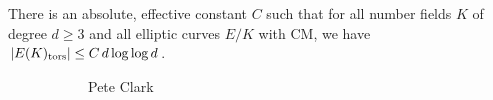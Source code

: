 \begin{frame}[plain]
\begin{thm}
There is an absolute, effective constant $C$ such that for all number fields $K$ of degree $d \geq 3$ and all elliptic curves $E/K$ with CM, we have $|E(K)_{\text{tors}}| \leq C\, d \log \log d$.
\end{thm}
	\begin{figure}[h]
	\centering
	\begin{subfigure}{0.3\textwidth}
	\captionsetup{labelformat=empty}
	\centering
	\caption{Pete Clark}
	\end{subfigure}
	\begin{subfigure}{0.3\textwidth}
	\captionsetup{labelformat=empty}
	\centering

\end{subfigure}
\end{figure}
\end{frame}
